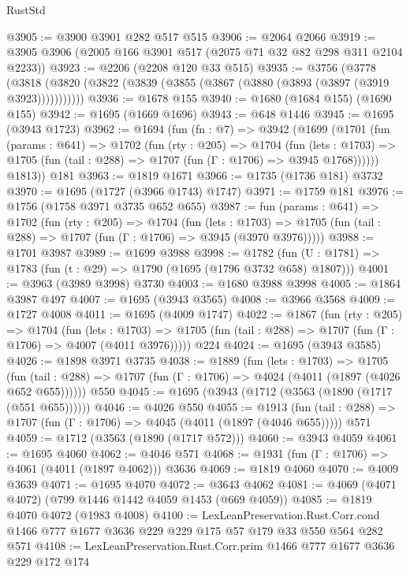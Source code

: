 \begin{lexlean}{RustStd}
\begin{coremodule}
@3905 := @3900 @3901 @282 @517 @515
@3906 := @2064 @2066
@3919 := @3905 @3906 (@2005 @166 @3901 @517 (@2075 @71 @32 @82 @298 @311 @2104 @2233))
@3923 := @2206 (@2208 @120 @33 @515)
@3935 := @3756
    (@3778 (@3818 (@3820 (@3822 (@3839 (@3855 (@3867 (@3880 (@3893 (@3897 (@3919 @3923)))))))))))
@3936 := @1678 @155
@3940 := @1680 (@1684 @155) (@1690 @155)
@3942 := @1695 (@1669 @1696)
@3943 := @648 @1446
@3945 := @1695 (@3943 @1723)
@3962 := @1694
    (fun (fn : @7) =>
    @3942
      (@1699
        (@1701
          (fun (params : @641) =>
          @1702
            (fun (rty : @205) =>
            @1704
              (fun (lets : @1703) =>
              @1705 (fun (tail : @288) => @1707 (fun (Γ : @1706) => @3945 @1768))))))
        @1813))
    @181
@3963 := @1819 @1671
@3966 := @1735 (@1736 @181) @3732
@3970 := @1695 (@1727 (@3966 @1743) @1747)
@3971 := @1759 @181
@3976 := @1756 (@1758 @3971 @3735 @652 @655)
@3987 := fun (params : @641) =>
  @1702
    (fun (rty : @205) =>
    @1704
      (fun (lets : @1703) =>
      @1705 (fun (tail : @288) => @1707 (fun (Γ : @1706) => @3945 (@3970 @3976)))))
@3988 := @1701 @3987
@3989 := @1699 @3988
@3998 := @1782 (fun (U : @1781) => @1783 (fun (t : @29) => @1790 (@1695 (@1796 @3732 @658) @1807)))
@4001 := @3963 (@3989 @3998) @3730
@4003 := @1680 @3988 @3998
@4005 := @1864 @3987 @497
@4007 := @1695 (@3943 @3565)
@4008 := @3966 @3568
@4009 := @1727 @4008
@4011 := @1695 (@4009 @1747)
@4022 := @1867
    (fun (rty : @205) =>
    @1704
      (fun (lets : @1703) =>
      @1705 (fun (tail : @288) => @1707 (fun (Γ : @1706) => @4007 (@4011 @3976)))))
    @224
@4024 := @1695 (@3943 @3585)
@4026 := @1898 @3971 @3735
@4038 := @1889
    (fun (lets : @1703) =>
    @1705 (fun (tail : @288) => @1707 (fun (Γ : @1706) => @4024 (@4011 (@1897 (@4026 @652 @655))))))
    @550
@4045 := @1695 (@3943 (@1712 (@3563 (@1890 (@1717 (@551 @655))))))
@4046 := @4026 @550
@4055 := @1913
    (fun (tail : @288) => @1707 (fun (Γ : @1706) => @4045 (@4011 (@1897 (@4046 @655)))))
    @571
@4059 := @1712 (@3563 (@1890 (@1717 @572)))
@4060 := @3943 @4059
@4061 := @1695 @4060
@4062 := @4046 @571
@4068 := @1931 (fun (Γ : @1706) => @4061 (@4011 (@1897 @4062))) @3636
@4069 := @1819 @4060
@4070 := @4009 @3639
@4071 := @1695 @4070
@4072 := @3643 @4062
@4081 := @4069 (@4071 @4072) (@799 @1446 @1442 @4059 @1453 (@669 @4059))
@4085 := @1819 @4070 @4072 (@1983 @4008)
@4100 := LexLeanPreservation.Rust.Corr.cond
    @1466
    @777
    @1677
    @3636
    @229
    @229
    @175
    @57
    @179
    @33
    @550
    @564
    @282
    @571
@4108 := LexLeanPreservation.Rust.Corr.prim @1466 @777 @1677 @3636 @229 @172 @174

\end{coremodule}
\end{lexlean}
